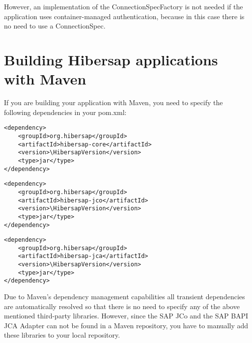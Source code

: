 However, an implementation of the ConnectionSpecFactory is not needed if the application uses container-managed authentication, because in this case there is no need to use a ConnectionSpec.


\section{Building Hibersap applications with Maven}

If you are building your application with Maven, you need to specify the following dependencies in your pom.xml:

\begin{Verbatim}[frame=single,label=hibersap-core,commandchars=\\\{\}]
<dependency>
    <groupId>org.hibersap</groupId>
    <artifactId>hibersap-core</artifactId>
    <version>\HibersapVersion</version>
    <type>jar</type>
</dependency>
\end{Verbatim}

\begin{Verbatim}[frame=single,label=hibersap-jco,commandchars=\\\{\}]
<dependency>
    <groupId>org.hibersap</groupId>
    <artifactId>hibersap-jco</artifactId>
    <version>\HibersapVersion</version>
    <type>jar</type>
</dependency>
\end{Verbatim}

\begin{Verbatim}[frame=single,label=hibersap-jca,commandchars=\\\{\}]
<dependency>
    <groupId>org.hibersap</groupId>
    <artifactId>hibersap-jca</artifactId>
    <version>\HibersapVersion</version>
    <type>jar</type>
</dependency>
\end{Verbatim}

Due to Maven's dependency management capabilities all transient dependencies are automatically resolved so that there is no need to specify any of the above mentioned third-party libraries. However, since the SAP JCo and the SAP BAPI JCA Adapter can not be found in a Maven repository, you have to manually add these libraries to your local repository.
